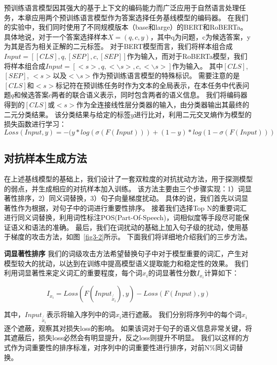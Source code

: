 预训练语言模型因其强大的基于上下文的编码能力而广泛应用于自然语言处理任务，本章应用两个预训练语言模型作为答案选择任务基线模型的编码器。
在我们的实验中，我们同时使用了不同规模版本（base和large）的BERT\cite{devlin2018bert}和RoBERTa\cite{liu2019roberta}。
具体地说，对于一个答案选择样本$X=(q, c, y)$，其中q为问题，c为候选答案，y为其是否为相关正解的二元标签。
对于BERT模型而言，我们将样本组合成$Input = [[CLS], q, [SEP], c, [SEP]]$作为输入，而对于RoBERTa模型，我们将样本组合成$Input = [<s>, q, <\backslash s>, c, <\backslash s>]$作为输入。
其中$[CLS]$, $[SEP]$, $<s>$以及$<\backslash s>$作为预训练语言模型的特殊标识。
需要注意的是$[CLS]$和$<s>$标记符在预训练任务时作为文本的全局表示，在本任务中代表问题$q$和候选答案$c$两者的联合语义表示，同时包含两者的语义信息。
我们将编码器得到的$[CLS]$或$<s>$作为全连接线性层分类器的输入，由分类器输出其最终的二元分类结果。
该分类结果与给定的标签$y$进行比对，利用二元交叉熵作为模型的损失函数进行学习：
\begin{equation}
    Loss(Input, y) = -(y * log(\sigma(F(Input))) + (1 - y) * log(1 - \sigma(F(Input)))
\end{equation}


\subsection{对抗样本生成方法}
在上述基线模型的基础上，我们设计了一套双粒度的对抗扰动方法，用于探测模型的弱点，并生成相应的对抗样本加入训练。
该方法主要由三个步骤实现：1）词显著性排序，2）同义词替换，3）句子向量梯度扰动。
具体的说，我们首先以词显著性作为根据，对句子中的词进行重要性排序。
接着我们选择Top N的重要词汇进行同义词替换，利用词性标注POS(Part-Of-Speech)，词相似度等手段尽可能保证语义和语法的准确。
最后，我们在词扰动的基础上加入句子级的扰动，使用基于梯度的攻击方法，如图~\ref{fig3-2}所示。
下面我们将详细地介绍我们的三步方法。




\textbf{词显著性排序} \quad 我们的词级攻击方法希望替换句子中对于模型重要的词汇，产生对模型较大的扰动，以达到在训练中提高模型语义提取能力和稳定性的效果。
我们利用词显著性来定义词汇的重要程度，每个词$x_i$的词显著性分数$I_{x_i}$计算如下：

\begin{equation}
    I_{x_i} = Loss(F(Input_{\not {x_i}}), y) - Loss(F(Input), y)
\end{equation}

其中，$Input_{\not {x_i}}$表示将输入序列中的词$x_i$进行遮蔽。
我们分别将序列中的每个词$x_i$逐个遮蔽，观察其对损失loss的影响。
如果该词对于句子的语义信息非常关键，将其遮蔽后，损失loss必然会有明显提升，反之loss则提升不明显。
我们以这样的方式作为词重要性的排序标准，对序列中的词重要性进行排序，对前N\%同义词替换。


